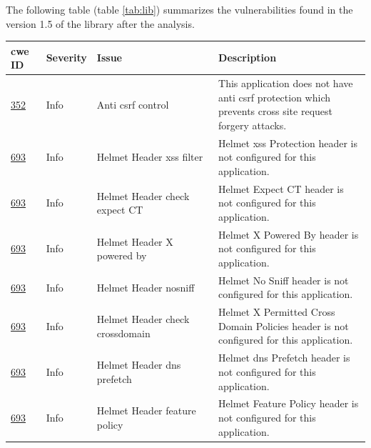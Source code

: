 \documentclass[a4paper, 12pt]{article} %
\begin{document}
                The following table (table \ref{tab:lib}) summarizes the vulnerabilities found in the version 1.5 of the library after the analysis.\\
                \begin{longtable}{||p{0.1\linewidth} | p{0.11\linewidth} | p{0.35\linewidth} | p{0.45\linewidth}||}
                    \hline
                    \textbf{\acrshort{cwe} ID} & \textbf{Severity} & \textbf{Issue} & \textbf{Description} \\ [0.5ex] 
                    \hline\hline
                    \href{https://cwe.mitre.org/data/definitions/352.html}{352} & Info &  Anti \acrshort{csrf} control &   This application does not have anti \acrshort{csrf} protection which prevents cross site request forgery attacks.\\
                    \hline
                    \href{https://cwe.mitre.org/data/definitions/693.html}{693} & Info &  Helmet Header \acrshort{xss} filter &  Helmet \acrshort{xss} Protection header is not configured for this application.\\
                    \hline
                    \href{https://cwe.mitre.org/data/definitions/693.html}{693} & Info &  Helmet Header check expect CT &   Helmet Expect CT header is not configured for this application. \\
                    \hline
                    \href{https://cwe.mitre.org/data/definitions/693.html}{693} & Info &  Helmet Header X powered by &  Helmet X Powered By header is not configured for this application. \\
                    \hline
                    \href{https://cwe.mitre.org/data/definitions/693.html}{693} & Info &  Helmet Header nosniff & Helmet No Sniff header is not configured for this application. \\
                    \hline
                    \href{https://cwe.mitre.org/data/definitions/693.html}{693} & Info &  Helmet Header check crossdomain & Helmet X Permitted Cross Domain Policies header is not configured for this application. \\
                    \hline
                    \href{https://cwe.mitre.org/data/definitions/693.html}{693} & Info &  Helmet Header \acrshort{dns} prefetch & Helmet \acrshort{dns} Prefetch header is not configured for this application. \\
                    \hline
                    \href{https://cwe.mitre.org/data/definitions/693.html}{693} & Info &  Helmet Header feature policy & Helmet Feature Policy header is not configured for this application. \\

\end{longtable}
\end{document}
